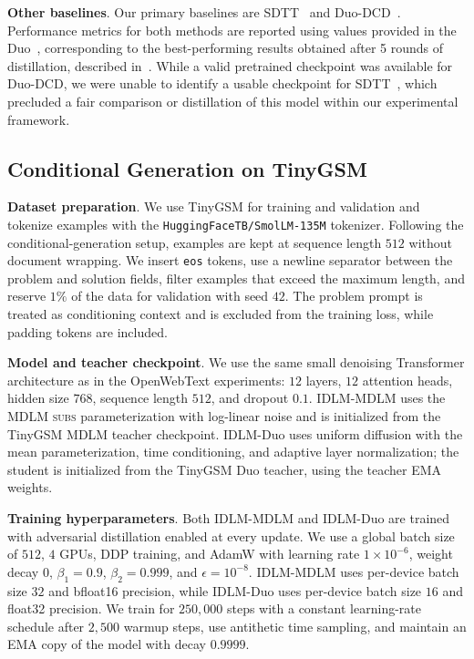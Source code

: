 \noindent \textbf{Other baselines}.
Our primary baselines are SDTT~\citep{deschenaux2024beyond} and Duo-DCD~\citep{sahoo2025the}. Performance metrics for both methods are reported using values provided in the Duo~\citep{sahoo2025the}, corresponding to the best-performing results obtained after 5 rounds of distillation, described in~\citep{sahoo2025the}. While a valid pretrained checkpoint was available for Duo-DCD, we were unable to identify a usable checkpoint for SDTT~\citep{deschenaux2024beyond}, which precluded a fair comparison or distillation of this model within our experimental framework.

\subsection{Conditional Generation on TinyGSM}
\label{app:tinygsm-experimental-details}

\noindent \textbf{Dataset preparation}.
We use TinyGSM for training and validation and tokenize examples with the \texttt{HuggingFaceTB/SmolLM-135M} tokenizer. Following the conditional-generation setup, examples are kept at sequence length $512$ without document wrapping. We insert \texttt{eos} tokens, use a newline separator between the problem and solution fields, filter examples that exceed the maximum length, and reserve $1\%$ of the data for validation with seed $42$. The problem prompt is treated as conditioning context and is excluded from the training loss, while padding tokens are included.

\noindent \textbf{Model and teacher checkpoint}.
We use the same small denoising Transformer architecture as in the OpenWebText experiments: $12$ layers, $12$ attention heads, hidden size $768$, sequence length $512$, and dropout $0.1$. IDLM-MDLM uses the MDLM \textsc{subs} parameterization with log-linear noise and is initialized from the TinyGSM MDLM teacher checkpoint. IDLM-Duo uses uniform diffusion with the mean parameterization, time conditioning, and adaptive layer normalization; the student is initialized from the TinyGSM Duo teacher, using the teacher EMA weights.

\noindent \textbf{Training hyperparameters}.
Both IDLM-MDLM and IDLM-Duo are trained with adversarial distillation enabled at every update. We use a global batch size of $512$, $4$ GPUs, DDP training, and AdamW with learning rate $1\times10^{-6}$, weight decay $0$, $\beta_1=0.9$, $\beta_2=0.999$, and $\epsilon=10^{-8}$. IDLM-MDLM uses per-device batch size $32$ and bfloat16 precision, while IDLM-Duo uses per-device batch size $16$ and float32 precision. We train for $250{,}000$ steps with a constant learning-rate schedule after $2{,}500$ warmup steps, use antithetic time sampling, and maintain an EMA copy of the model with decay $0.9999$.

